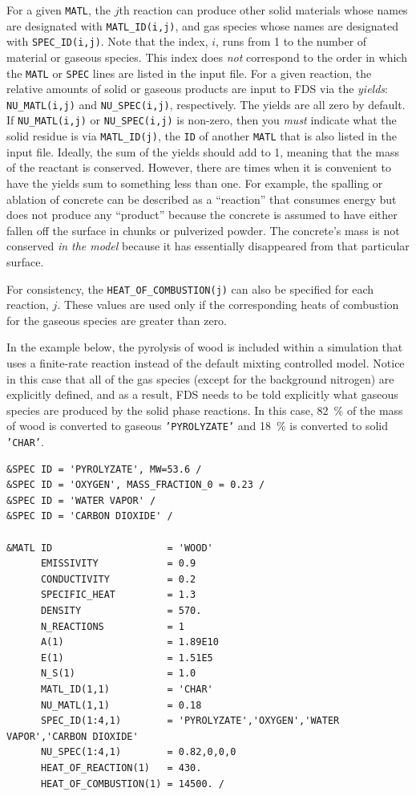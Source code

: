 \documentclass[11pt]{book}
\newcommand{\ct}{\tt\small}
\begin{document}
For a given {\ct MATL}, the $j$th reaction can produce other solid materials whose names are designated with {\ct MATL\_ID(i,j)}, and gas
species whose names are designated with {\ct SPEC\_ID(i,j)}. Note that the index, $i$, runs from 1 to the number of material or gaseous species. This index
does {\em not} correspond to the order in which the {\ct MATL} or {\ct SPEC} lines are listed in the input file.
For a given reaction, the relative amounts of solid or gaseous products are input
to FDS via the {\em yields}: {\ct NU\_MATL(i,j)} and {\ct NU\_SPEC(i,j)}, respectively.
The yields are all zero by default. If {\ct NU\_MATL(i,j)} or {\ct NU\_SPEC(i,j)} is non-zero, then you {\em must} indicate what the
solid residue is via {\ct MATL\_ID(j)}, the {\ct ID} of another {\ct MATL} that is also listed in the input file. Ideally, the sum of the
yields should add to 1, meaning that the mass of the reactant is
conserved. However, there are times when it is convenient to have the
yields sum to something less than one. For example, the spalling or
ablation of concrete can be described as a ``reaction'' that consumes
energy but does not produce any ``product'' because the concrete is
assumed to have either fallen off the surface in chunks or pulverized
powder. The concrete's mass is not conserved {\em in the model}
because it has essentially disappeared from that particular surface.

For consistency, the {\ct HEAT\_OF\_COMBUSTION(j)} can also be specified for each reaction, $j$. These values are
used only if the corresponding heats of combustion for the gaseous species are greater than zero.

In the example below, the pyrolysis of wood is included within a simulation that uses
a finite-rate reaction instead of the default mixting controlled model. Notice in this case that
all of the gas species (except for the background nitrogen) are explicitly defined, and as a result, FDS
needs to be told explicitly what gaseous species are produced by the solid phase reactions. In this case, 82~\% of the
mass of wood is converted to gaseous {\ct 'PYROLYZATE'} and 18~\% is converted to solid {\ct 'CHAR'}.

\footnotesize
\begin{verbatim}
&SPEC ID = 'PYROLYZATE', MW=53.6 /
&SPEC ID = 'OXYGEN', MASS_FRACTION_0 = 0.23 /
&SPEC ID = 'WATER VAPOR' /
&SPEC ID = 'CARBON DIOXIDE' /

&MATL ID                    = 'WOOD'
      EMISSIVITY            = 0.9
      CONDUCTIVITY          = 0.2
      SPECIFIC_HEAT         = 1.3
      DENSITY               = 570.
      N_REACTIONS           = 1
      A(1)                  = 1.89E10
      E(1)                  = 1.51E5
      N_S(1)                = 1.0
      MATL_ID(1,1)          = 'CHAR'
      NU_MATL(1,1)          = 0.18
      SPEC_ID(1:4,1)        = 'PYROLYZATE','OXYGEN','WATER VAPOR','CARBON DIOXIDE'
      NU_SPEC(1:4,1)        = 0.82,0,0,0
      HEAT_OF_REACTION(1)   = 430.
      HEAT_OF_COMBUSTION(1) = 14500. /
\end{verbatim} \normalsize
\end{document}
